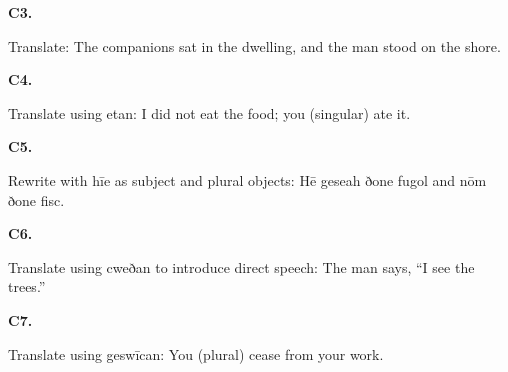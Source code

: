 \par\begin{minipage}{\linewidth}\raggedright
\textbf{C3.}

Translate: The companions sat in the dwelling, and the man stood on the shore.

\end{minipage}\par\addvspace{4pt}

\par\begin{minipage}{\linewidth}\raggedright
\textbf{C4.}

Translate using etan: I did not eat the food; you (singular) ate it.

\end{minipage}\par\addvspace{4pt}

\par\begin{minipage}{\linewidth}\raggedright
\textbf{C5.}

Rewrite with hīe as subject and plural objects: Hē geseah ðone fugol and nōm ðone fisc.

\end{minipage}\par\addvspace{4pt}

\par\begin{minipage}{\linewidth}\raggedright
\textbf{C6.}

Translate using cweðan to introduce direct speech: The man says, “I see the trees.”

\end{minipage}\par\addvspace{4pt}

\par\begin{minipage}{\linewidth}\raggedright
\textbf{C7.}

Translate using geswīcan: You (plural) cease from your work.

\end{minipage}\par\addvspace{4pt}

